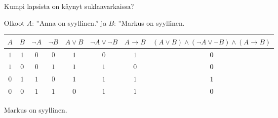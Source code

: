 \begin{tehtavasivu}
\begin{tehtava}
Kumpi lapsista on käynyt suklaavarkaissa?
    \begin{vastaus} \newline
        Olkoot $A$: ''Anna on syyllinen.'' ja $B$: ''Markus on syyllinen.
        \begin{center}
		    \begin{tabular}{|c|c|c|c|c|c|c|c|}\hline
		    $A$ & $B$ & $\lnot A$ & $\lnot B$ & $A\lor B$ & $\lnot A\lor \lnot B$ & $A\to B$ & $(A\lor B)\land(\lnot A\lor \lnot B)\land(A\to B)$ \\ \hline
		    $1$ & $1$ & $0$ & $0$ & $1$ & $0$ & $1$ & $0$ \\ %
		    $1$ & $0$ & $0$ & $1$ & $1$ & $1$ & $0$ & $0$ \\
		    $0$ & $1$ & $1$ & $0$ & $1$ & $1$ & $1$ & $1$ \\
		    $0$ & $0$ & $1$ & $1$ & $0$ & $1$ & $1$ & $0$ \\ \hline
\end{tabular}
\end{center}
    Markus on syyllinen.
    \end{vastaus}
    
\end{tehtava}


\end{tehtavasivu}
